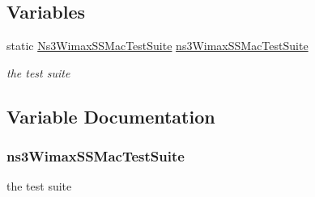 \subsection*{Variables}
\begin{DoxyCompactItemize}
\item 
static \hyperlink{classNs3WimaxSSMacTestSuite}{Ns3\+Wimax\+S\+S\+Mac\+Test\+Suite} \hyperlink{ss-mac-test_8cc_af169e3b1f5787732cce64d415fb75b10}{ns3\+Wimax\+S\+S\+Mac\+Test\+Suite}
\begin{DoxyCompactList}\small\item\em the test suite \end{DoxyCompactList}\end{DoxyCompactItemize}


\subsection{Variable Documentation}
\subsubsection[{\texorpdfstring{ns3\+Wimax\+S\+S\+Mac\+Test\+Suite}{ns3WimaxSSMacTestSuite}}]{ ns3\+Wimax\+S\+S\+Mac\+Test\+Suite\hspace{0.3cm}{\ttfamily [static]}}\hypertarget{ss-mac-test_8cc_af169e3b1f5787732cce64d415fb75b10}{}\label{ss-mac-test_8cc_af169e3b1f5787732cce64d415fb75b10}


the test suite 

